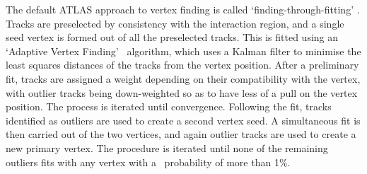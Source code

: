 The default ATLAS approach to vertex finding is called
`finding-through-fitting' \cite{1742-6596-119-3-032033}. Tracks are preselected
by consistency with the interaction region, and a single seed vertex is formed
out of all the preselected tracks. This is fitted using an `Adaptive Vertex
Finding'~\cite{0954-3899-34-12-N01} algorithm, which uses a Kalman filter to
minimise the least squares distances of the tracks from the vertex position.
After a preliminary fit, tracks are assigned a weight depending on their
compatibility with the vertex, with outlier tracks being down-weighted so as to
have less of a pull on the vertex position. The process is iterated until
convergence.  Following the fit, tracks identified as outliers are used to
create a second vertex seed. A simultaneous fit is then carried out of the two
vertices, and again outlier tracks are used to create a new primary vertex. The
procedure is iterated until none of the remaining outliers fits with any vertex
with a \chisquared\ probability of more than 1\%.
